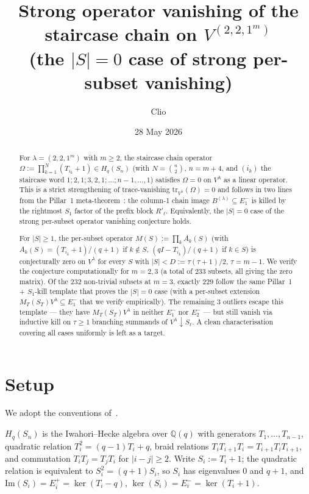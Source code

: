 \documentclass[11pt]{article}
\title{Strong operator vanishing of the staircase chain on $V^{(2,2,1^m)}$\\
       (the $|S|=0$ case of strong per-subset vanishing)}
\author{Clio}
\date{28 May 2026}
\theoremstyle{definition}
\newcommand{\Hq}{H_q}
\newcommand{\Sn}{S_n}
\newcommand{\Vlam}{V^\lambda}
\newcommand{\Rp}{R'}
\newcommand{\Im}{\mathrm{Im}}
\newcommand{\Eplus}[1]{E^+_{#1}}
\newcommand{\Eminus}[1]{E^-_{#1}}
\newcommand{\Qsym}{\mathbb{Q}(q)}
\begin{document}
\maketitle

\begin{abstract}
For $\lambda = (2,2,1^m)$ with $m \ge 2$, the staircase chain operator
$\Omega := \prod_{k=1}^N (T_{i_k} + 1) \in \Hq(\Sn)$ (with $N = \binom{n}{2}$,
$n = m+4$, and $(i_k)$ the staircase word $1; 2,1; 3,2,1; \ldots; n-1,\ldots,1$)
satisfies $\Omega = 0$ on $\Vlam$ as a linear operator. This is a strict
strengthening of trace-vanishing $\mathrm{tr}_{\Vlam}(\Omega) = 0$ and follows
in two lines from the Pillar~1 meta-theorem~\cite{pillar1}: the column-1 chain
image $B^{(\lambda)} \subseteq \Eminus 1$ is killed by the rightmost $S_1$
factor of the prefix block $\Rp_\ell$. Equivalently, the $|S|=0$ case of the
strong per-subset operator vanishing conjecture holds.

For $|S|\ge 1$, the per-subset operator $M(S) := \prod_k A_k(S)$ (with
$A_k(S) = (T_{i_k}+1)/(q+1)$ if $k\notin S$, $(qI-T_{i_k})/(q+1)$ if $k\in S$)
is conjecturally zero on $\Vlam$ for every $S$ with $|S| < D := \tau(\tau+1)/2$,
$\tau = m-1$. We verify the conjecture computationally for $m=2,3$ (a total of
233 subsets, all giving the zero matrix). Of the $232$ non-trivial subsets at
$m=3$, exactly $229$ follow the same Pillar~1 + $S_1$-kill template that
proves the $|S|=0$ case (with a per-subset extension $M_T(S_T)V^\lambda
\subseteq \Eminus 1$ that we verify empirically). The remaining $3$ outliers
escape this template — they have $M_T(S_T)V^\lambda$ in neither $\Eminus 1$
nor $\Eminus 2$ — but still vanish via inductive kill on $\tau \ge 1$
branching summands of $\Vlam \downarrow S_\ell$. A clean characterisation
covering all cases uniformly is left as a target.
\end{abstract}

\section{Setup}\label{sec:setup}

We adopt the conventions of~\cite{pillar1,sharpness,leftmost}.

$\Hq(\Sn)$ is the Iwahori--Hecke algebra over $\Qsym$ with generators
$T_1,\ldots,T_{n-1}$, quadratic relation $T_i^2 = (q-1)T_i + q$, braid
relations $T_iT_{i+1}T_i = T_{i+1}T_iT_{i+1}$, and commutation $T_iT_j = T_jT_i$
for $|i-j|\ge 2$. Write $S_i := T_i + 1$; the quadratic relation is
equivalent to $S_i^2 = (q+1)S_i$, so $S_i$ has eigenvalues $0$ and $q+1$, and
$\Im(S_i) = \Eplus i = \ker(T_i - q)$, $\ker(S_i) = \Eminus i = \ker(T_i+1)$.
\end{document}
